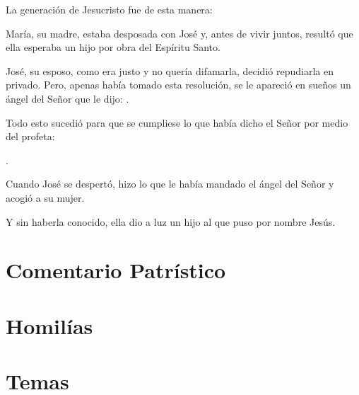 
 


\begin{scripture}
	La generación de Jesucristo fue de esta manera:
	
	María, su madre, estaba desposada con José y, antes de vivir juntos, resultó que ella esperaba un hijo por obra del Espíritu Santo.
	
	José, su esposo, como era justo y no quería difamarla, decidió repudiarla en privado. Pero, apenas había tomado esta resolución, se le apareció en sueños un ángel del Señor que le dijo: .
	
	Todo esto sucedió para que se cumpliese lo que había dicho el Señor por medio del profeta:
	
	.
	
	Cuando José se despertó, hizo lo que le había mandado el ángel del Señor y acogió a su mujer.
	
	Y sin haberla conocido, ella dio a luz un hijo al que puso por nombre Jesús.
\end{scripture}

\newsection

\section{Comentario Patrístico}




\newsection

\section{Homilías}

\homiliasNavidad



\newsection			



\newsection

\section{Temas}

\temasNavidad